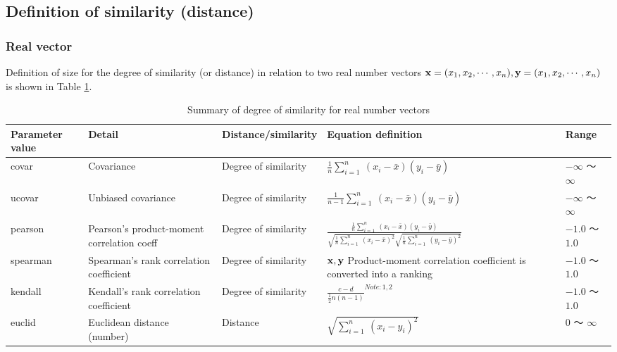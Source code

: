 \subsection*{Definition of similarity (distance)}

\subsubsection*{Real vector}

Definition of size for the degree of similarity (or distance) in relation to two real number vectors ${\bf x}=(x_1,x_2,\cdots,x_n),{\bf y}=(x_1,x_2,\cdots,x_n)$ is shown in Table \ref{tbl:simReal}.

\begin{table}[htbp]
\begin{center}
\caption{Summary of degree of similarity for real number vectors\label{tbl:simReal}}
{\small 
\renewcommand{\arraystretch}{2.0}
\begin{tabular}{lllll}
\hline
Parameter value & Detail & Distance/similarity & Equation definition & Range\\
\hline
covar	& Covariance	& Degree of similarity & 
$
\frac{1}{n}\sum_{i=1}^n~(x_i-\bar{x})(y_i-\bar{y})
$
 & $-\infty$ 〜 $\infty$\\

ucovar	& Unbiased covariance	& Degree of similarity & 
$
\frac{1}{n-1}\sum_{i=1}^n~(x_i-\bar{x})(y_i-\bar{y})
$
 & $-\infty$ 〜 $\infty$\\

pearson	& Pearson's product-moment correlation coeff & Degree of similarity & 
$
\frac{\frac{1}{n}\sum_{i=1}^n~(x_i-\bar{x})(y_i-\bar{y})}{\sqrt{\frac{1}{n}\sum_{i=1}^n~(x_i-\bar{x})^2}\sqrt{\frac{1}{n}\sum_{i=1}^n~(y_i-\bar{y})^2}}~
$
 & $-1.0$ 〜 $1.0$ \\

spearman & Spearman's rank correlation coefficient	& Degree of similarity &
$\bf{x},\bf{y}$ Product-moment correlation coefficient is converted into a ranking 
 & $-1.0$ 〜 $1.0$ \\

kendall  & Kendall's rank correlation coefficient	& Degree of similarity &
$
\frac{c-d}{\frac{1}{2}n(n-1)} ^{Note:1,2}
$
 & $-1.0$ 〜 $1.0$ \\

euclid   & Euclidean distance (number)   & Distance & 
$
\sqrt{\sum_{i=1}^n~(x_i-y_i)^2}~
$
 & $0$ 〜 $\infty$ \\


\end{tabular}}
\end{center}
\end{table}
